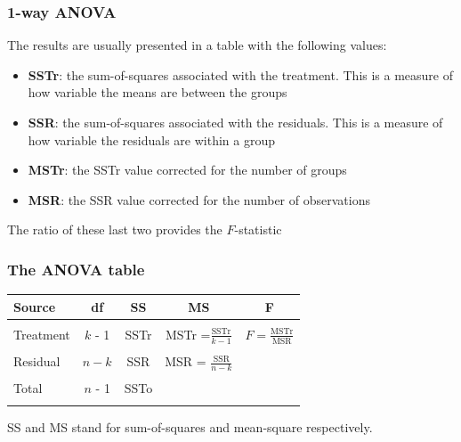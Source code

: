 \documentclass[12pt,xcolor=dvipsnames,handout,mathserif,aspectratio=169]{beamer}
\newcommand{\bbl}[1]{{\color{NavyBlue} \textbf{#1}}}
\begin{document}
\begin{frame}\frametitle{1-way ANOVA}

The results are usually presented in a table with the following values:
\begin{itemize}
\item \bbl{SSTr}: the sum-of-squares associated with the treatment. This is a measure of how variable the means are between the groups
\item \bbl{SSR}: the sum-of-squares associated with the residuals. This is a measure of how variable the residuals are within a group
\item \bbl{MSTr}: the SSTr value corrected for the number of groups
\item \bbl{MSR}: the SSR value corrected for the number of observations
\end{itemize}
The ratio of these last two provides the $F$-statistic
\end{frame}

\begin{frame}\frametitle{The ANOVA table}

\vspace{0.2cm}
\begin{center}
{\small{
\begin{tabular}{lcccc}\hline
Source& df& SS& MS& F \\ \hline
&&&&\\
Treatment & $k$ - 1& SSTr& MSTr =$\displaystyle\frac{\mbox{SSTr}}{k - 1}$&$F =
 \displaystyle\frac{\mbox{MSTr}}{\mbox{MSR}}$\\
 &&&&\\
Residual &$n - k$& SSR& MSR = $\displaystyle\frac{\mbox{SSR}}{n - k}$& \\
&&&&\\
Total& $n$ - 1& SSTo&&\\
\\ \hline
\end{tabular}}}
\end{center}
SS and MS stand for sum-of-squares and mean-square respectively.
\end{frame}
\end{document}
